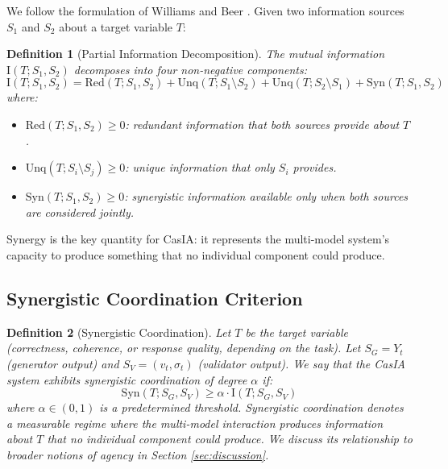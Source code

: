 \documentclass[11pt,a4paper]{article}
\newtheorem{definition}{Definition}[section]
\theoremstyle{remark}
\newcommand{\Syn}{\mathrm{Syn}}
\newcommand{\Red}{\mathrm{Red}}
\newcommand{\Unq}{\mathrm{Unq}}
\newcommand{\MI}{\mathrm{I}}
\begin{document}
We follow the formulation of Williams and Beer \cite{williams2010pid}. Given two information sources $S_1$ and $S_2$ about a target variable $T$:

\begin{definition}[Partial Information Decomposition]
\label{def:pid}
The mutual information $\MI(T; S_1, S_2)$ decomposes into four non-negative components:
\begin{equation}
\label{eq:pid}
  \MI(T; S_1, S_2) = \Red(T; S_1, S_2) + \Unq(T; S_1 \setminus S_2) + \Unq(T; S_2 \setminus S_1) + \Syn(T; S_1, S_2)
\end{equation}
where:
\begin{itemize}
  \item $\Red(T; S_1, S_2) \geq 0$: \emph{redundant} information that both sources provide about $T$.
  \item $\Unq(T; S_i \setminus S_j) \geq 0$: \emph{unique} information that only $S_i$ provides.
  \item $\Syn(T; S_1, S_2) \geq 0$: \emph{synergistic} information available only when both sources are considered jointly.
\end{itemize}
\end{definition}

Synergy is the key quantity for CasIA: it represents the multi-model system's capacity to produce something that no individual component could produce.

\subsection{Synergistic Coordination Criterion}

\begin{definition}[Synergistic Coordination]
\label{def:agency}
Let $T$ be the target variable (correctness, coherence, or response quality, depending on the task). Let $S_G = Y_t$ (generator output) and $S_V = (v_t, \sigma_t)$ (validator output). We say that the CasIA system exhibits \emph{synergistic coordination} of degree $\alpha$ if:
\begin{equation}
\label{eq:criterion}
  \Syn(T; S_G, S_V) \geq \alpha \cdot \MI(T; S_G, S_V)
\end{equation}
where $\alpha \in (0, 1)$ is a predetermined threshold. Synergistic coordination denotes a measurable regime where the multi-model interaction produces information about $T$ that no individual component could produce. We discuss its relationship to broader notions of agency in Section \ref{sec:discussion}.
\end{definition}
\end{document}
